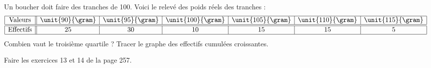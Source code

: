 
\begin{exercice}\label{exosmath-0534}

    Un boucher doit faire des tranches de \unit{100}{\gram}. Voici le relevé des poids réels des tranches :
    \begin{equation*}
        \begin{array}[]{|c||c|c|c|c|c|c|}
            \hline
            \text{Valeurs}&\unit{90}{\gram}&\unit{95}{\gram}&\unit{100}{\gram}&\unit{105}{\gram}&\unit{110}{\gram}&\unit{115}{\gram}\\
            \hline\hline
            \text{Effectifs}&25&30&10&15&15&5\\
            \hline
        \end{array}
    \end{equation*}
    Combien vaut le troisième quartile ? Tracer le graphe des effectifs cumulées croissantes.

    Faire les exercices 13 et 14 de la page 257.

\end{exercice}
